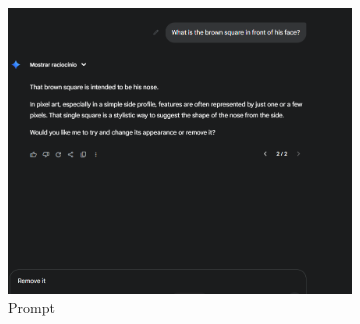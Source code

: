 \begin{figure}[htbp]
    \centering
    \caption{\small Processo da geração 9 do sprite em side view no Gemini Pro em julho/2025}
    \label{fig:geminiPro9}

    \begin{subfigure}{0.8\linewidth}
        \includegraphics[width=1\linewidth]{figs/geminiPro/chat5/tela3.PNG}
        \caption{\small Prompt}
        \label{fig:geminiPro9Prompt1}
    \end{subfigure}
    \begin{subfigure}{0.23\linewidth}

\end{subfigure}
\end{figure}
